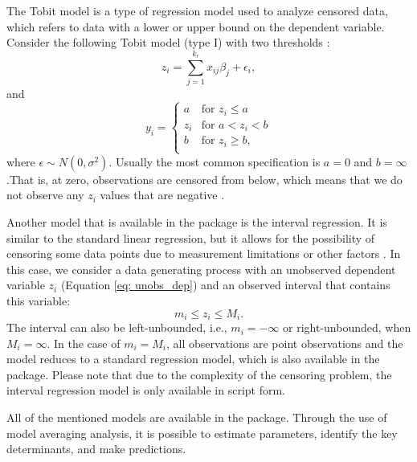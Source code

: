The Tobit model is a type of regression model used to analyze
censored data, which refers to data with a lower or upper bound
on the dependent variable. Consider the following Tobit model
(type I) with two thresholds \citep{cottrell_luchcetti_gretl_manual}:
\begin{equation}
	z_i= \sum_{j=1}^{k_r}x_{ij}\beta_{j} + \epsilon_i,
	\label{eq: unobs_dep}
\end{equation}
and
\begin{equation}
	y_i= \left \{ 
	\begin{array}{ll}
		a & \text{for }  z_i \le a\\
		z_i &\text{for }  a < z_i < b\\
		b & \text{for }  z_i \ge b,\\
	\end{array}   \right.
\label{eq: tobit}
\end{equation}
where $\epsilon \sim N(0, \sigma^2)$. Usually the most
common specification is  $a=0$ and $b= \infty$.That is,
at zero, observations are censored from below, which means
that we do not observe any $z_i$ values that are negative \citep{verbeek2018guide}.

Another model that is available in the  package is
the interval regression. It is similar to the standard linear
regression, but it allows for the possibility of censoring
some data points due to measurement limitations or other
factors \citep{Stewart_1983, Bettin_Lucchetti_2012, cottrell_luchcetti_gretl_manual}.
In this case, we consider a data generating process with an
unobserved dependent variable $z_i$ (Equation \ref{eq: unobs_dep})
and an observed interval that contains this variable:
\begin{equation}
	m_i \leq z_i \leq  M_i.
\end{equation}
The interval can also be left-unbounded, i.e., $m_i = -\infty$
or right-unbounded, when $M_i = \infty$. In the case of
$m_i = M_i$, all observations are point observations and the
model reduces to a standard regression model, which is also
available in the  package. Please note that due to
the complexity of the censoring problem, the interval
regression model is only available in script form.

All of the mentioned models are available in the 
package. Through the use of model averaging analysis, it is
possible to estimate parameters, identify the key determinants,
and make predictions.

